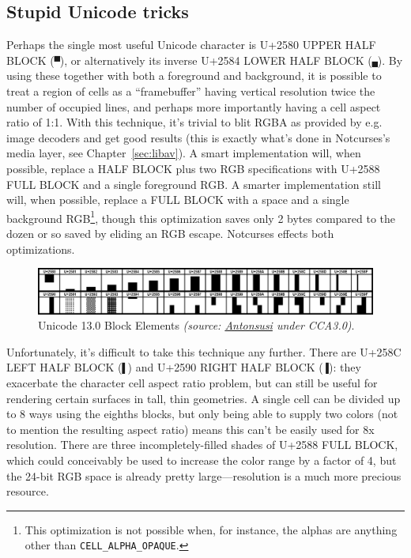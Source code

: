 \subsection{Stupid Unicode tricks}
Perhaps the single most useful Unicode character is U+2580 UPPER HALF BLOCK
(\texttt{▀}), or alternatively its inverse U+2584 LOWER HALF BLOCK
(\texttt{▄}). By using these together with both a foreground and background,
it is possible to treat a region of cells as a ``framebuffer'' having
vertical resolution twice the number of occupied lines, and perhaps more importantly
having a cell aspect ratio of 1:1. With this technique, it's trivial to blit
RGBA as provided by e.g. image decoders and get good results (this is exactly
what's done in Notcurses's media layer, see Chapter~\ref{sec:libav}). A smart
implementation will, when possible, replace a HALF BLOCK plus two RGB specifications
with U+2588 FULL BLOCK and a single foreground RGB. A smarter implementation
still will, when possible, replace a FULL BLOCK with a space and a single
background RGB\footnote{This optimization is not possible when, for instance,
the alphas are anything other than \texttt{CELL\_ALPHA\_OPAQUE}.}, though this
optimization saves only 2 bytes compared to the dozen or so saved by eliding
an RGB escape. Notcurses effects both optimizations.


\begin{figure}[!htb]
    \centering
    \includegraphics[width=.75\linewidth]{media/blockelements.png}
    \caption{Unicode 13.0 Block Elements \textit{(source: \href{https://commons.wikimedia.org/wiki/File:UCB_Block_Elements.png}{Antonsusi} under CCA3.0)}.}
    \label{fig:blockelements}
\end{figure}

Unfortunately, it's difficult to take this technique any further. There are
U+258C LEFT HALF BLOCK (\texttt{▌}) and U+2590 RIGHT HALF BLOCK (\texttt{▐}):
they exacerbate the character cell aspect ratio problem, but can still be
useful for rendering certain surfaces in tall, thin geometries. A single cell
can be divided up to 8 ways using the eighths blocks, but only being able to
supply two colors (not to mention the resulting aspect ratio) means this can't
be easily used for 8x resolution. There are three incompletely-filled shades of
U+2588 FULL BLOCK, which could conceivably be used to increase the color range
by a factor of 4, but the 24-bit RGB space is already pretty large---resolution
is a much more precious resource.

